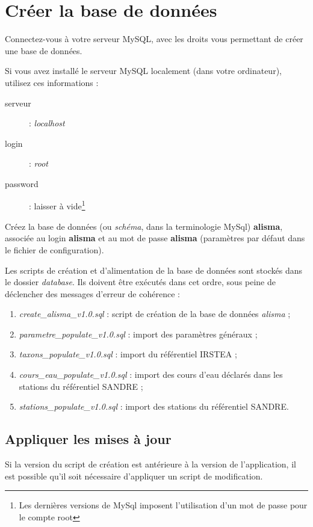 \section{Créer la base de données}
Connectez-vous à votre serveur MySQL, avec les droits vous permettant de créer une base de données.

Si vous avez installé le serveur MySQL localement (dans votre ordinateur), utilisez ces informations :
\begin{description}
\item[serveur] : \textit{localhost}
\item[login] : \textit{root}
\item[password] : laisser à vide\footnote{Les dernières versions de MySql imposent l'utilisation d'un mot de passe pour le compte root}
\end{description}

Créez la base de données (ou \textit{schéma}, dans la terminologie MySql) \textbf{alisma}, associée au login \textbf{alisma} et au mot de passe \textbf{alisma} (paramètres par défaut dans le fichier de configuration).

Les scripts de création et d'alimentation de la base de données sont stockés dans le dossier \textit{database}. Ils doivent être exécutés dans cet ordre, sous peine de déclencher des messages d'erreur de cohérence :
\begin{enumerate}
\item \textit{create\_alisma\_v1.0.sql} : script de création de la base de données \textit{alisma} ;
\item \textit{parametre\_populate\_v1.0.sql} : import des paramètres généraux ;
\item \textit{taxons\_populate\_v1.0.sql} : import du référentiel IRSTEA ;
\item \textit{cours\_eau\_populate\_v1.0.sql} : import des cours d'eau déclarés dans les stations du référentiel SANDRE ;
\item \textit{stations\_populate\_v1.0.sql} : import des stations du référentiel SANDRE.
\end{enumerate}

\subsection{Appliquer les mises à jour}

Si la version du script de création est antérieure à la version de l'application, il est possible qu'il soit nécessaire d'appliquer un script de modification.

